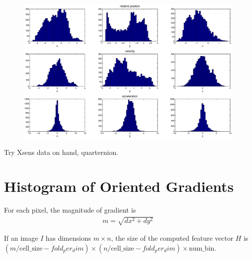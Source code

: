 \begin{figure}
\centering
\includegraphics[trim=30mm 0 0 0,
clip, width=1.1\columnwidth]{figures/motion_hist.eps}
\caption{}
\label{fig:motion-hist}
\end{figure}

Try Xsens data on hand, quarternion.

\section{Histogram of Oriented Gradients}
For each pixel, the magnitude of gradient is 
\begin{align*}
m = \sqrt{dx^2 + dy^2}
\end{align*}

If an image $I$ has dimensions $m\times n$, the size of the computed feature
vector $H$ is $(m/\text{cell\_size} - fold_per_dim) \times (n/\text{cell\_size}
- fold_per_dim) \times \text{num\_bin}$.

